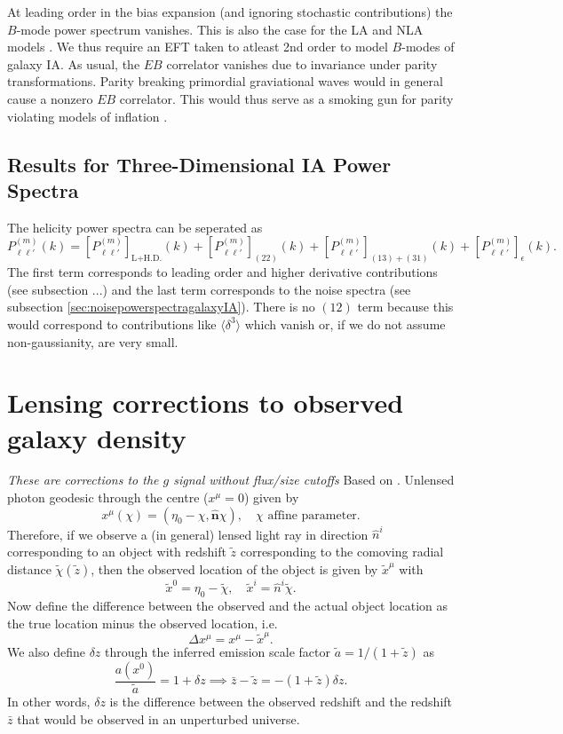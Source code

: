 \documentclass[11pt]{book}
\begin{document}
At leading order in the bias expansion (and ignoring stochastic contributions) the $B$-mode power spectrum vanishes. This is also the case for the LA and NLA models \cite{bakx2023effectivefieldtheoryintrinsic}. We thus require an EFT taken to atleast 2nd order to model $B$-modes of galaxy IA. As usual, the $EB$ correlator vanishes due to invariance under parity transformations. Parity breaking primordial graviational waves would in general cause a nonzero $EB$ correlator. This would thus serve as a smoking gun for parity violating models of inflation \cite{Biagetti_2020}.


\subsection{Results for Three-Dimensional IA Power Spectra}
The helicity power spectra can be seperated as
\begin{equation}
    P_{\ell \ell'}^{(m)}(k) = [P^{(m)}_{\ell\ell'}]_{\text{L+H.D.}}(k) + [P^{(m)}_{\ell\ell'}]_{(22)}(k) + [P^{(m)}_{\ell\ell'}]_{(13) + (31)}(k) + [P^{(m)}_{\ell\ell'}]_{\epsilon}(k).
\end{equation}
The first term corresponds to leading order and higher derivative contributions (see subsection ...) %
and the last term corresponds to the noise spectra (see subsection \ref{sec:noisepowerspectragalaxyIA}). There is no $(12)$ term because this would correspond to contributions like $\langle \delta^3 \rangle$ which vanish or, if we do not assume non-gaussianity, are very small.

\section{Lensing corrections to observed galaxy density}
\textit{These are corrections to the $g$ signal without flux/size cutoffs} Based on \cite{Schmidt2013_clustering}. Unlensed photon geodesic through the centre ($x^\mu = 0$) given by
$$
x^\mu(\chi) = (\eta_0-\chi, \hat{\mathbf n}\chi), \quad \chi \text{ affine parameter.}
$$
Therefore, if we observe a (in general) lensed light ray in direction $\hat n^i$ corresponding to an object with redshift $\tilde z$ corresponding to the comoving radial distance $\tilde \chi(\tilde z)$, then the observed location of the object is given by $\tilde x^\mu$ with
\begin{equation}
    \tilde x^0 = \eta_0 - \tilde \chi, \quad \tilde x^i = \hat n^i \tilde \chi.
\end{equation}
Now define the difference between the observed and the actual object location as the true location minus the observed location, i.e.
\begin{equation}
    \Delta x^\mu = x^{\mu} - \tilde x^\mu.
\end{equation}
We also define $\delta z$ through the inferred emission scale factor $\tilde a = 1/(1+\tilde z)$ as
\begin{equation}
    \frac{a(x^0)}{\tilde a} = 1+\delta z \implies \bar z - \tilde z = -(1+\tilde z)\delta z.
\end{equation}
In other words, $\delta z$ is the difference between the observed redshift and the redshift $\bar z$ that would be observed in an unperturbed universe.
\end{document}

